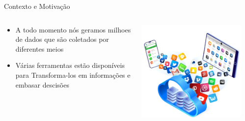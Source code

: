 \documentclass[10pt,brazil]{beamer}
\theoremstyle{definition}
\begin{document}
\begin{frame}[t,allowframebreaks]{Contexto e Motivação}
  \begin{columns}
    \begin{column}[t]{0.5\textwidth}
      \begin{itemize}
        \item[] A todo momento nós geramos milhoes de dados que são coletados por diferentes meios
        \item[] Várias ferramentas estão disponíveis para Transforma-los em informações e embasar descisões
      \end{itemize}
    \end{column}
    \begin{column}{0.5\textwidth}
      \begin{center}
        \includegraphics[width=1\textwidth]{sis.png}
      \end{center}
    \end{column}
    \begin{column}{0.5\textwidth}
      

\end{column}
\end{columns}
\end{frame}
\end{document}
